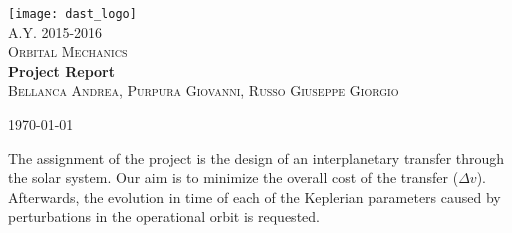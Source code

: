 \begin{titlepage}
	\begin{center}
		

		\texttt{[image: dast\_logo]}\\[2cm]
		\textsc{\Large A.Y. 2015-2016}\\[0.2cm]
		
		
		\textsc{\Large Orbital Mechanics}\\[4cm]
		
		
		\textbf{\huge Project Report}\\[0.5cm]
		\textsc{\large Bellanca Andrea, Purpura Giovanni, Russo Giuseppe Giorgio}\\[0.1cm]
				
		\vfill	
		
		{\today}
	\end{center}	
	
\end{titlepage}

\newpage
\tableofcontents
\newpage
\listoffigures


\abstract
The assignment of the project is the design of an interplanetary transfer through the solar system.
Our aim is to minimize the overall cost of the transfer ($\Delta v$).
Afterwards, the evolution in time of each of the Keplerian parameters caused by perturbations in the operational orbit is requested.